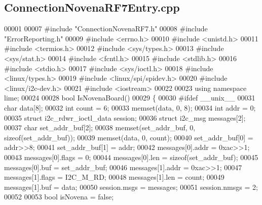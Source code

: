 \subsection{Connection\+Novena\+R\+F7\+Entry.\+cpp}
\label{ConnectionNovenaRF7Entry_8cpp_source}

\begin{DoxyCode}
00001 
00007 \textcolor{preprocessor}{#include "ConnectionNovenaRF7.h"}
00008 \textcolor{preprocessor}{#include "ErrorReporting.h"}
00009 \textcolor{preprocessor}{#include <errno.h>}
00010 \textcolor{preprocessor}{#include <unistd.h>}
00011 \textcolor{preprocessor}{#include <termios.h>}
00012 \textcolor{preprocessor}{#include <sys/types.h>}
00013 \textcolor{preprocessor}{#include <sys/stat.h>}
00014 \textcolor{preprocessor}{#include <fcntl.h>}
00015 \textcolor{preprocessor}{#include <stdlib.h>}
00016 \textcolor{preprocessor}{#include <stdio.h>}
00017 \textcolor{preprocessor}{#include <sys/ioctl.h>}
00018 \textcolor{preprocessor}{#include <linux/types.h>}
00019 \textcolor{preprocessor}{#include <linux/spi/spidev.h>}
00020 \textcolor{preprocessor}{#include <linux/i2c-dev.h>}
00021 \textcolor{preprocessor}{#include <iostream>}
00022 
00023 \textcolor{keyword}{using namespace }lime;
00024 
00028 \textcolor{keywordtype}{bool} IsNovenaBoard()
00029 \{
00030 \textcolor{preprocessor}{#ifdef \_\_unix\_\_}
00031     \textcolor{keywordtype}{char} data[8];
00032     \textcolor{keywordtype}{int} count = 6;
00033     memset(data, 0, 8);
00034     \textcolor{keywordtype}{int} addr = 0;
00035     \textcolor{keyword}{struct }i2c\_rdwr\_ioctl\_data session;
00036     \textcolor{keyword}{struct }i2c\_msg messages[2];
00037     \textcolor{keywordtype}{char} set\_addr\_buf[2];
00038     memset(set\_addr\_buf, 0, \textcolor{keyword}{sizeof}(set\_addr\_buf));
00039     memset(data, 0, count);
00040     set\_addr\_buf[0] = addr>>8;
00041     set\_addr\_buf[1] = addr;
00042     messages[0].addr = 0xac>>1;
00043     messages[0].flags = 0;
00044     messages[0].len = \textcolor{keyword}{sizeof}(set\_addr\_buf);
00045     messages[0].buf = set\_addr\_buf;
00046     messages[1].addr = 0xac>>1;
00047     messages[1].flags = I2C\_M\_RD;
00048     messages[1].len = count;
00049     messages[1].buf = data;
00050     session.msgs = messages;
00051     session.nmsgs = 2;
00052 
00053     \textcolor{keywordtype}{bool} isNovena = \textcolor{keyword}{false};

\end{DoxyCode}
